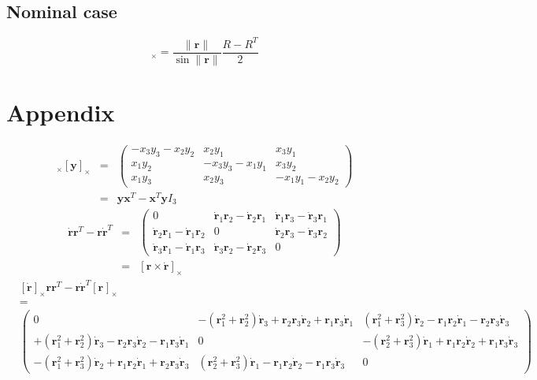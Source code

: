 \documentclass {article}
\newcommand\rot{\mathbf{r}}
\newcommand\x{\mathbf{x}}
\newcommand\y{\mathbf{y}}
\newcommand\rcross[1]{[\rot_{#1}]_{\times}}
\newcommand\xcross{[\mathbf{x}]_{\times}}
\newcommand\ycross{[\mathbf{y}]_{\times}}
\newcommand\rdotcross{\left[\dot{\rot}\right]_{\times}}
\newcommand\normr{\|\rot\|}
\begin{document}
\subsection{Nominal case}

\begin{equation}
\rcross{} = \frac{\normr}{\sin \normr} \frac{R - R^T}{2}
\end{equation}

\section{Appendix}

\begin{eqnarray}
\xcross \ycross &=&
\left(\begin{array}{ccc}
-x_3y_3 - x_2y_2 & x_2y_1 & x_3y_1\\
x_1y_2 & -x_3y_3-x_1y_1 & x_3y_2 \\
x_1y_3 & x_2y_3 & -x_1y_1 - x_2y_2
\end{array}\right)\\
\label{eq:xcrossycross}
&=& \y\x^T-\x^T\y I_3
\end{eqnarray}
\begin{eqnarray}
\dot{\rot}\rot^T-\rot\dot{\rot}^T &=&
\left(\begin{array}{ccc}
0 & \dot{\rot}_1\rot_2 - \dot{\rot}_2\rot_1 & \dot{\rot}_1\rot_3 - \dot{\rot}_3\rot_1\\
\dot{\rot}_2\rot_1 - \dot{\rot}_1\rot_2 & 0 & \dot{\rot}_2\rot_3 - \dot{\rot}_3\rot_2\\
\dot{\rot}_3\rot_1 - \dot{\rot}_1\rot_3 & \dot{\rot}_3\rot_2 - \dot{\rot}_2\rot_3 & 0\end{array}\right)\\
\label{eq:dotrrT-rdotrT}
&=& \left[\rot\times\dot{\rot}\right]_{\times}
\end{eqnarray}
{\tiny
\begin{eqnarray*}
&\rdotcross\rot\rot^T-\rot\dot{\rot}^T\rcross{}&\\
&=&\\
&\left(\begin{array}{ccc}
0&-(\rot_1^2+\rot_2^2)\dot{\rot}_3+\rot_2\rot_3\dot{\rot}_2+\rot_1\rot_3\dot{\rot}_1 & (\rot_1^2+\rot_3^2)\dot{\rot}_2-\rot_1\rot_2\dot{\rot}_1-\rot_2\rot_3\dot{\rot}_3\\
+(\rot_1^2+\rot_2^2)\dot{\rot}_3-\rot_2\rot_3\dot{\rot}_2-\rot_1\rot_3\dot{\rot}_1 & 0 & -(\rot_2^2+\rot_3^2)\dot{\rot}_1+\rot_1\rot_2\dot{\rot}_2+\rot_1\rot_3\dot{\rot}_3\\
-(\rot_1^2+\rot_3^2)\dot{\rot}_2+\rot_1\rot_2\dot{\rot}_1+\rot_2\rot_3\dot{\rot}_3 & (\rot_2^2+\rot_3^2)\dot{\rot}_1-\rot_1\rot_2\dot{\rot}_2-\rot_1\rot_3\dot{\rot}_3 & 0
\end{array}\right)&
\end{eqnarray*}
}
\end{document}
